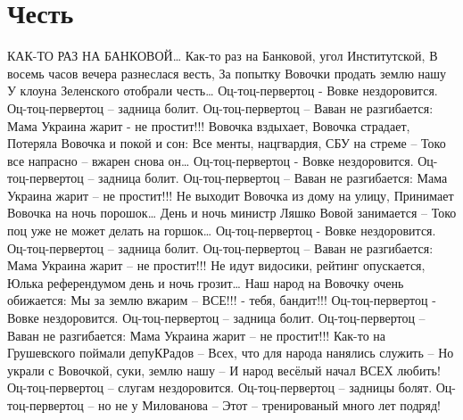  
 
 
 
 
\chapter{Честь}
\label{sec:slova.chestj}

КАК-ТО РАЗ НА БАНКОВОЙ…
Как-то раз на Банковой, угол Институтской,
В восемь часов вечера разнеслася весть,
За попытку Вовочки продать землю нашу
У клоуна Зеленского отобрали честь…
Оц-тоц-первертоц - Вовке нездоровится.
Оц-тоц-первертоц – задница болит.
Оц-тоц-первертоц – Ваван не разгибается:
Мама Украина жарит - не простит!!!
Вовочка вздыхает, Вовочка страдает,
Потеряла Вовочка и покой и сон:
Все менты, нацгвардия, СБУ на стреме –
Токо все напрасно – вжарен снова он…
Оц-тоц-первертоц - Вовке нездоровится.
Оц-тоц-первертоц – задница болит.
Оц-тоц-первертоц – Ваван не разгибается:
Мама Украина жарит – не простит!!!
Не выходит Вовочка из дому на улицу,
Принимает Вовочка на ночь порошок…
День и ночь министр Ляшко Вовой занимается –
Токо поц уже не может делать на горшок…
Оц-тоц-первертоц - Вовке нездоровится.
Оц-тоц-первертоц – задница болит.
Оц-тоц-первертоц – Ваван не разгибается:
Мама Украина жарит – не простит!!!
Не идут видосики, рейтинг опускается,
Юлька референдумом день и ночь грозит…
Наш народ на Вовочку очень обижается:
Мы за землю вжарим – ВСЕ!!! - тебя, бандит!!!
Оц-тоц-первертоц - Вовке нездоровится.
Оц-тоц-первертоц – задница болит.
Оц-тоц-первертоц – Ваван не разгибается:
Мама Украина жарит – не простит!!!
Как-то на Грушевского поймали депуКРадов –
Всех, что для народа нанялись служить –
Но украли с Вовочкой, суки, землю нашу –
И народ весёлый начал ВСЕХ любить!
Оц-тоц-первертоц – слугам нездоровится.
Оц-тоц-первертоц – задницы болят.
Оц-тоц-первертоц – но не у Милованова –
Этот – тренированый много лет подряд!
